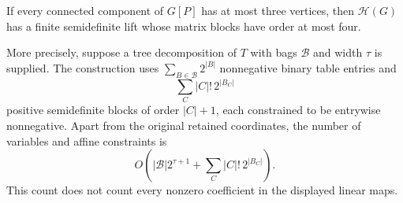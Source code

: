 \begin{theorem}\label{graph:small-components}
If every connected component of $G[P]$ has at most three vertices, then
$\mathcal H(G)$ has a finite semidefinite lift whose matrix blocks have
order at most four.

More precisely, suppose a tree decomposition of $T$ with bags
$\mathcal B$ and width $\tau$ is supplied. The construction uses
$\sum_{B\in\mathcal B}2^{|B|}$ nonnegative binary table entries and
\begin{equation}\label{graph:block-count}
 \sum_C |C|!\,2^{|B_C|}
\end{equation}
positive semidefinite blocks of order $|C|+1$, each constrained to be
entrywise nonnegative. Apart from the original retained coordinates, the
number of variables and affine constraints is
\[
 O\left(|\mathcal B|2^{\tau+1}
          +\sum_C |C|!\,2^{|B_C|}\right).
\]
This count does not count every nonzero coefficient in the displayed
linear maps.
\end{theorem}
